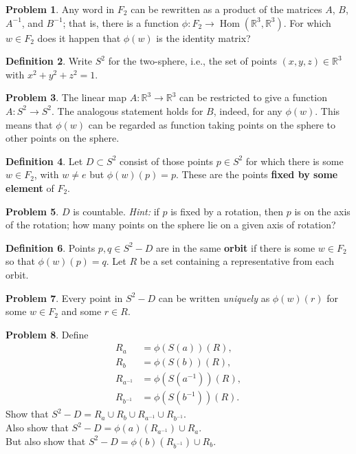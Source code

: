 \documentclass[12pt]{article}
\newcommand{\R}{\mathbb{R}}
\theoremstyle{definition}
\newtheorem{problem}{Problem}
\newtheorem{definition}[problem]{Definition}
\DeclareMathOperator{\Hom}{Hom}
\begin{document}
\begin{problem}
  Any word in $F_2$ can be rewritten as a product of the matrices $A$,
  $B$, $A^{-1}$, and $B^{-1}$; that is, there is a function $\phi :
  F_2 \to \Hom(\R^3,\R^3)$.  For which $w \in F_2$ does it happen that
  $\phi(w)$ is the identity matrix?
\end{problem}

\begin{definition}
Write $S^2$ for the two-sphere, i.e., the set of points $(x,y,z) \in \R^3$ with $x^2 + y^2 + z^2 = 1$.
\end{definition}

\begin{problem}
  The linear map $A : \R^3 \to \R^3$ can be restricted to give a
  function $A : S^2 \to S^2$.  The analogous statement holds for $B$,
  indeed, for any $\phi(w)$.  This means that $\phi(w)$ can be
  regarded as function taking points on the sphere to other points on
  the sphere.
\end{problem}

\begin{definition}
  Let $D \subset S^2$ consist of those points $p \in S^2$ for which
  there is some $w \in F_2$, with $w \neq e$ but $\phi(w)(p) =
  p$.  These are the points \textbf{fixed by some element} of $F_2$.
\end{definition}

\begin{problem}
$D$ is countable.  \textit{Hint:} if $p$ is fixed by a rotation, then $p$ is on the axis of the rotation; how many points on the sphere lie on a given axis of rotation?
\end{problem}

\begin{definition}
  Points $p, q \in S^2 - D$ are in the same \textbf{orbit} if there is
  some $w \in F_2$ so that $\phi(w)(p) = q$.  Let $R$ be a set
  containing a representative from each orbit.
\end{definition}

\begin{problem}
Every point in $S^2 - D$ can be written \textit{uniquely} as $\phi(w)(r)$ for some $w \in F_2$ and some $r \in R$.
\end{problem}

\begin{problem}
Define
\begin{align*}
R_a &= \phi(S(a))(R), \\
R_b &= \phi(S(b))(R), \\
R_{a^{-1}} &= \phi(S(a^{-1}))(R), \\
R_{b^{-1}} &= \phi(S(b^{-1}))(R).
\end{align*}
Show that $S^2 - D = R_a \cup R_b \cup R_{a^{-1}} \cup R_{b^{-1}}$. \\
Also show that $S^2 - D = \phi(a)(R_{a^{-1}}) \cup R_a$. \\
But also show that $S^2 - D = \phi(b)(R_{b^{-1}}) \cup R_b$.
\end{problem}
\end{document}
